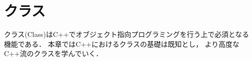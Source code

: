 
\part{クラス}
クラス(Class)はC++でオブジェクト指向プログラミングを行う上で必須となる機能である．
本章ではC++におけるクラスの基礎は既知とし，
より高度なC++流のクラスを学んでいく．









